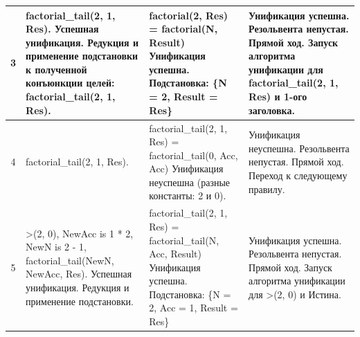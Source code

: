 \begin{tabularx}{\textwidth}{|c|>{\small}X|>{\small}X|>{\small}X|}
	3                                                                                  &
	factorial\_tail(2, 1, Res). \newline
	Успешная унификация. \newline
	Редукция и применение подстановки к полученной конъюнкции целей: \newline
	factorial\_tail(2, 1, Res).                                                        &
	factorial(2, Res) = \newline
	factorial(N, Result) \newline
	Унификация успешна. \newline
	Подстановка: \newline
	\{N = 2, Result = Res\}                                                            &
	Унификация успешна. \newline
	Резольвента непустая. \newline
	Прямой ход. \newline
	Запуск алгоритма унификации для factorial\_tail(2, 1, Res) и 1-ого заголовка.              \\
	\hline

	4                                                                                  &
	factorial\_tail(2, 1, Res).                                                        &
	factorial\_tail(2, 1, Res) = \newline
	factorial\_tail(0, Acc, Acc) \newline
	Унификация неуспешна (разные константы: 2 и 0).                                    &
	Унификация неуспешна. \newline
	Резольвента непустая. \newline
	Прямой ход. Переход к следующему правилу.                                                  \\
	\hline

	5                                                                                  &
	>(2, 0), \newline
	NewAcc is 1 * 2, \newline
	NewN is 2 - 1, \newline
	factorial\_tail(NewN, NewAcc, Res). \newline
	Успешная унификация. \newline
	Редукция и применение подстановки.                                                 &
	factorial\_tail(2, 1, Res) = \newline
	factorial\_tail(N, Acc, Result) \newline
	Унификация успешна. \newline
	Подстановка: \newline
	\{N = 2, Acc = 1, Result = Res\}                                                   &
	Унификация успешна. \newline
	Резольвента непустая. \newline
	Прямой ход. \newline
	Запуск алгоритма унификации для >(2, 0) и Истина.                                          \\
	\hline


\end{tabularx}
